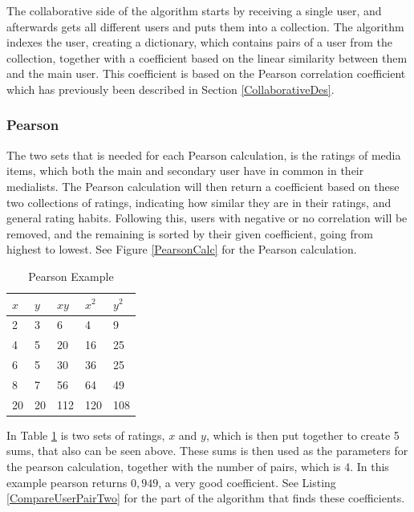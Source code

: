 The collaborative side of the algorithm starts by receiving a single user, and afterwards gets all different users and puts them into a collection. The algorithm indexes the user, creating a dictionary, which contains pairs of a user from the collection, together with a coefficient based on the linear similarity between them and the main user. This coefficient is based on the Pearson correlation coefficient which has previously been described in Section \ref{CollaborativeDes}.

\subsubsection{Pearson}

The two sets that is needed for each Pearson calculation, is the ratings of media items, which both the main and secondary user have in common in their medialists. The Pearson calculation will then return a coefficient based on these two collections of ratings, indicating how similar they are in their ratings, and general rating habits. Following this, users with negative or no correlation will be removed, and the remaining is sorted by their given coefficient, going from highest to lowest. See Figure \ref{PearsonCalc} for the Pearson calculation.

\begin{table}[htb]
\centering
\begin{tabular}{|l|l|l|l|l|} \hline
	\textbf{$x$} & \textbf{$y$} & \textbf{$xy$}
	& \textbf{$x^2$} & \textbf{$y^2$} \\ \hline
	2 & 3 & 6 & 4 & 9 \\ \hline
	4 & 5 & 20 & 16 & 25 \\ \hline
	6 & 5 & 30 & 36 & 25 \\ \hline
	8 & 7 & 56 & 64 & 49 \\ \hline\hline
	20 & 20 & 112 & 120 & 108 \\ \hline
\end{tabular}
\caption{Pearson Example}
\label{PearsonEx}
\end{table} 

In Table \ref{PearsonEx} is two sets of ratings, $x$ and $y$, which is then put together to create 5 sums, that also can be seen above. These sums is then used as the parameters for the pearson calculation, together with the number of pairs, which is 4. In this example pearson returns $0,949$, a very good coefficient. See Listing \ref{CompareUserPairTwo} for the part of the algorithm that finds these coefficients.

